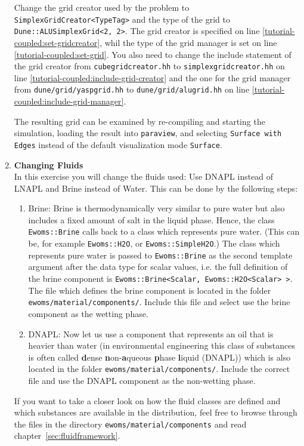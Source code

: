 \begin{enumerate}
  Change the grid creator used by the problem to
  \texttt{SimplexGridCreator<TypeTag>} and the type of the grid to
  \texttt{Dune::ALUSimplexGrid<2, 2>}. The grid creator is specified
  on line \ref{tutorial-coupled:set-gridcreator}, whil the type of the
  \Dune grid manager is set on line
  \ref{tutorial-coupled:set-grid}. You also need to change the include
  statement of the grid creator from \texttt{cubegridcreator.hh} to
  \texttt{simplexgridcreator.hh} on line
  \ref{tutorial-coupled:include-grid-creator} and the one for the grid
  manager from \texttt{dune/grid/yaspgrid.hh} to
  \texttt{dune/grid/alugrid.hh} on line \ref{tutorial-coupled:include-grid-manager}.

  The resulting grid can be examined by re-compiling and starting the
  simulation, loading the result into \texttt{paraview}, and selecting
  \texttt{Surface with Edges} instead of the default visualization
  mode \texttt{Surface}.

\item \textbf{Changing Fluids} \\
  In this exercise you will change the fluids used: Use DNAPL instead
  of LNAPL and Brine instead of Water. This can be done by the
  following steps:
\begin{enumerate}
\item Brine: Brine is thermodynamically very similar to pure water but
  also includes a fixed amount of salt in the liquid phase.  Hence,
  the class \texttt{Ewoms::Brine} calls back to a class which
  represents pure water. (This can be, for example
  \texttt{Ewoms::H2O}, or \texttt{Ewoms::SimpleH2O}.) The class which
  represents pure water is passed to \texttt{Ewoms::Brine} as the
  second template argument after the data type for scalar values,
  i.e. the full definition of the brine component is
  \texttt{Ewoms::Brine<Scalar, Ewoms::H2O<Scalar> >}. The file which
  defines the brine component is located in the folder
  \texttt{ewoms/material/components/}.  Include this file and select
  use the brine component as the wetting phase.
\item DNAPL: Now let us use a component that represents an oil that
  is heavier than water (in environmental engineering this class of
  substances is often called \textbf{d}ense
  \textbf{n}on-\textbf{a}queous \textbf{p}hase \textbf{l}iquid
  (DNAPL)) which is also located in the folder
  \texttt{ewoms/material/components/}. Include the correct file and
  use the DNAPL component as the non-wetting phase.
\end{enumerate}
If you want to take a closer look on how the fluid classes are defined
and which substances are available in the \eWoms distribution, feel
free to browse through the files in the directory
\texttt{ewoms/material/components} and read
chapter~\ref{sec:fluidframework}.


\end{enumerate}
